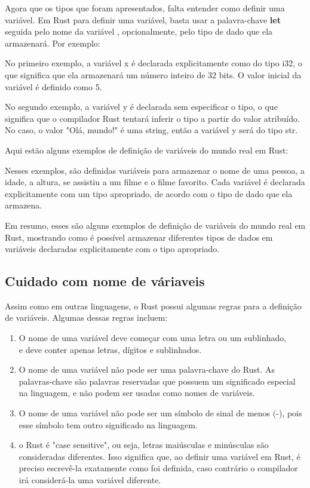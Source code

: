 \documentclass[12pt,a4paper,oneside]{abntex2}
\begin{document}
Agora que os tipos que foram apresentados, falta entender como definir uma variável. Em Rust 
para definir uma variável, basta usar a palavra-chave \textbf{let} seguida pelo nome da variável , opcionalmente, pelo tipo de dado que ela armazenará. Por exemplo:
%

No primeiro exemplo, a variável x é declarada explicitamente como do tipo i32, o que significa que ela armazenará um número inteiro de 32 bits. O valor inicial da variável é definido como 5.

No segundo exemplo, a variável y é declarada sem especificar o tipo, o que significa que o compilador Rust tentará inferir o tipo a partir do valor atribuído. No caso, o valor "Olá, mundo!" é uma string, então a variável y será do tipo str.

Aqui estão alguns exemplos de definição de variáveis do mundo real em Rust:
%


Nesses exemplos, são definidas variáveis para armazenar o nome de uma pessoa, a idade, a altura, se assistiu a um filme e o filme favorito. Cada variável é declarada explicitamente com um tipo apropriado, de acordo com o tipo de dado que ela armazena.

Em resumo, esses são alguns exemplos de definição de variáveis do mundo real em Rust, mostrando como é possível armazenar diferentes tipos de dados em variáveis declaradas explicitamente com o tipo apropriado.



\subsection{Cuidado com nome de váriaveis}

 Assim como em outras linguagens, o Rust possui algumas regras para a definição de variáveis. Algumas dessas regras incluem:
\begin{enumerate}
    \item O nome de uma variável deve começar com uma letra ou um sublinhado, \\ e deve conter apenas letras, dígitos e sublinhados.
    \item O nome de uma variável não pode ser uma palavra-chave do Rust. As palavras-chave são palavras reservadas que possuem um significado especial na linguagem, e não podem ser usadas como nomes de variáveis.
    \item O nome de uma variável não pode ser um símbolo de sinal de menos (-), pois esse símbolo tem outro significado na linguagem.
    \item o Rust é "case sensitive", ou seja, letras maiúsculas e minúsculas são consideradas diferentes. Isso significa que, ao definir uma variável em Rust, é preciso escrevê-la exatamente como foi definida, caso contrário o compilador irá considerá-la uma variável diferente.

\end{enumerate}
\end{document}
